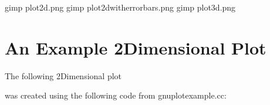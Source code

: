 \documentclass[letterpaper,10pt,english]{sphinxmanual}
\begin{document}
\begin{sphinxVerbatim}[commandchars=\\\{\}]
\PYGZdl{} gimp plot\PYGZhy{}2d.png
\PYGZdl{} gimp plot\PYGZhy{}2d\PYGZhy{}with\PYGZhy{}error\PYGZhy{}bars.png
\PYGZdl{} gimp plot\PYGZhy{}3d.png
\end{sphinxVerbatim}


\section{An Example 2\sphinxhyphen{}Dimensional Plot}
\label{\detokenize{gnuplot:an-example-2-dimensional-plot}}
The following 2\sphinxhyphen{}Dimensional plot

\begin{figure}[htbp]
\centering

\noindent{}
\end{figure}

was created using the following code from gnuplot\sphinxhyphen{}example.cc:
\end{document}
